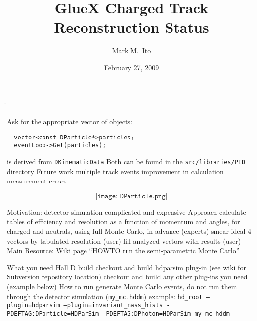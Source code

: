 \documentclass[xcolor=dvipsnames]{beamer}
\begin{document}
\title{GlueX Charged Track Reconstruction Status}
\author[M.\ Ito]{Mark M.\ Ito}
\date{February 27, 2009}


\f{\titlepage}

\begin{frame}[fragile]
  \be
  \I Ask for the appropriate vector of objects:
\begin{verbatim}
  vector<const DParticle*>particles;
  eventLoop->Get(particles);
\end{verbatim}
   is derived from {\tt DKinematicData}
  \I Both can be found in the {\tt src/libraries/PID} directory
  \I Future work
    \be
    \I multiple track events
    \I improvement in calculation measurement errors
    \ee
  \ee
\end{frame}

\f{
$$
\texttt{[image: DParticle.png]}
$$
}

\f{
  \be
  \I Motivation: detector simulation complicated and expensive
  \I Approach
    \be
    \I calculate tables of efficiency and resolution as a function of momentum
    and angles, for charged and neutrals, using full Monte Carlo, in advance
    (experts)
    \I smear ideal 4-vectors by tabulated resolution (user)
    \I fill analyzed vectors with results (user)
    \ee
  \I Main Resource: Wiki page ``HOWTO run the semi-parametric Monte Carlo''
  \ee
}

\f{
  \be
  \I What you need
    \be
    \I Hall D build
    \I checkout and build hdparsim plug-in (see wiki for Subversion repository
    location)
    \I checkout and build any other plug-ins you need (example below)
    \ee
  \I How to run
    \be
    \I generate Monte Carlo events, do not run them through the detector
    simulation ({\tt my\_mc.hddm})
    \I example: {\tt hd\_root --plugin=hdparsim --plugin=invariant\_mass\_hists
      -PDEFTAG:DParticle=HDParSim -PDEFTAG:DPhoton=HDParSim my\_mc.hddm}
    \ee
  \ee
}
\end{document}
